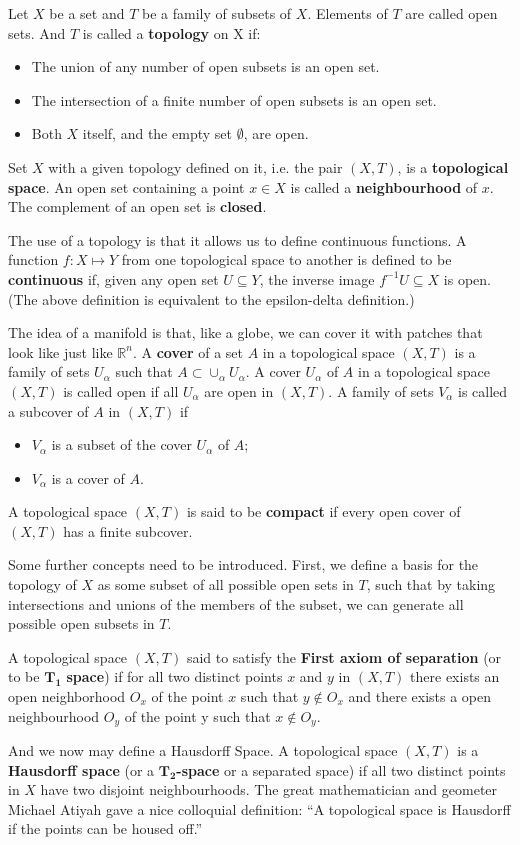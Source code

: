 \documentclass[a4paper,11pt]{article}
\theoremstyle{remark}
\begin{document}
Let $X$ be a set and $T$ be a family of subsets of $X$. Elements of $T$
are called open sets. And $T$ is called a \textbf{topology} on X if: 
\begin{itemize}
\item The union of any number of open subsets is an open set.
\item The intersection of a finite number of open subsets is an open set.
\item Both $X$ itself, and the empty set $\emptyset$, are open.
\end{itemize}
Set $X$ with a given topology defined on it, i.e. the pair $(X,T)$, is a
\textbf{topological space}. An open set containing a point $x\in X$ is
called a \textbf{neighbourhood} of $x$. The complement of an open set is \textbf{closed}.
\par
The use of a topology is that it allows us to define continuous
functions. A function $f: X \mapsto Y$ from one topological space to
another is defined to be \textbf{continuous} if, given any open set $U
\subseteq Y$, the inverse image $f^{-1}U \subseteq X$ is open. (The
above definition is equivalent to the epsilon-delta definition.)\par
The idea of a manifold is that, like a globe, we can cover it with
patches that look like just like $\mathbb{R}^n$. A \textbf{cover} of a set $A$
in a topological space $(X,T)$ is a family of sets ${U_\alpha}$ such
that $A\subset\cup_{\alpha}U_{\alpha}$. A cover ${U_{\alpha}}$ of $A$
in a topological space $(X,T)$ is called open if all $U_{\alpha}$ are
open in $(X,T)$. A family of sets ${V_{\alpha}}$ is called a subcover
of $A$ in $(X,T)$ if
\begin{itemize}
\item ${V_{\alpha}}$ is a subset of the cover ${U_{\alpha}}$ of $A$;
\item ${V_{\alpha}}$ is a cover of $A$.
\end{itemize}
A topological space $(X,T)$ is said to be \textbf{compact} if every open
cover of $(X,T)$ has a finite subcover.\par
Some further concepts need to be introduced. First, we define a basis
for the topology of $X$ as some subset of all possible open sets in
$T$, such that by taking intersections and unions of the members of
the subset, we can generate all possible open subsets in $T$.\par A
topological space $(X,T)$ said to satisfy the \textbf{First axiom of
  separation} (or to be $\mathbf{T_1}$ \textbf{space}) if for all two
distinct points $x$ and $y$ in $(X,T)$ there exists an open
neighborhood $O_x$ of the point $x$ such that $y\not\in O_x$ and there
exists a open neighbourhood $O_y$ of the point y such that $x\not\in
O_y$.\par And we now may define a Hausdorff Space. A topological space
$(X,T)$ is a \textbf{Hausdorff space} (or a $\mathbf{T_2}$\textbf{-space} or
a separated space) if all two distinct points in $X$ have two disjoint
neighbourhoods. The great mathematician and geometer Michael Atiyah gave a nice
colloquial definition: ``A topological space is Hausdorff if the points
can be housed off.'' 
\end{document}
